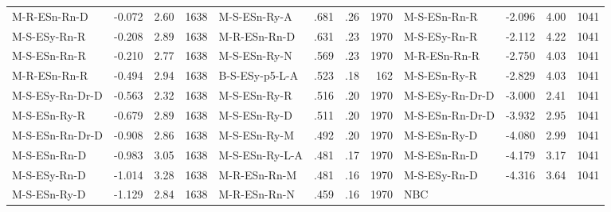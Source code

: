\documentclass[11pt,a4paper]{article}
\begin{document}
\begin{table}[]
\begin{tabular}[t]{lrrrlrrrlrrr}
        M-R-ESn-Rn-D & -0.072 & 2.60 & 1638 & M-S-ESn-Ry-A & .681 & .26 & 1970 & M-S-ESn-Rn-R & -2.096 & 4.00 & 1041  \\
        M-S-ESy-Rn-R & -0.208 & 2.89 & 1638 & M-R-ESn-Rn-D & .631 & .23 & 1970 & M-S-ESy-Rn-R & -2.112 & 4.22 & 1041  \\
        M-S-ESn-Rn-R & -0.210 & 2.77 & 1638 & M-S-ESn-Ry-N & .569 & .23 & 1970 & M-R-ESn-Rn-R & -2.750 & 4.03 & 1041  \\
        M-R-ESn-Rn-R & -0.494 & 2.94 & 1638 & B-S-ESy-p5-L-A & .523 & .18 & 162 & M-S-ESn-Ry-R & -2.829 & 4.03 & 1041  \\
        M-S-ESy-Rn-Dr-D & -0.563 & 2.32 & 1638 & M-S-ESn-Ry-R & .516 & .20 & 1970 & M-S-ESy-Rn-Dr-D & -3.000 & 2.41 & 1041  \\
        M-S-ESn-Ry-R & -0.679 & 2.89 & 1638 & M-S-ESn-Ry-D & .511 & .20 & 1970 & M-S-ESn-Rn-Dr-D & -3.932 & 2.95 & 1041  \\
        M-S-ESn-Rn-Dr-D & -0.908 & 2.86 & 1638 & M-S-ESn-Ry-M & .492 & .20 & 1970 & M-S-ESn-Ry-D & -4.080 & 2.99 & 1041  \\
        M-S-ESn-Rn-D & -0.983 & 3.05 & 1638 & M-S-ESn-Ry-L-A & .481 & .17 & 1970 & M-S-ESn-Rn-D & -4.179 & 3.17 & 1041  \\
        M-S-ESy-Rn-D & -1.014 & 3.28 & 1638 & M-R-ESn-Rn-M & .481 & .16 & 1970 & M-S-ESy-Rn-D & -4.316 & 3.64 & 1041  \\
        M-S-ESn-Ry-D & -1.129 & 2.84 & 1638 & M-R-ESn-Rn-N & .459 & .16 & 1970 & NBC &  &  &   \\
        \bottomrule
    \end{tabular}
\end{table}
    
\end{document}
